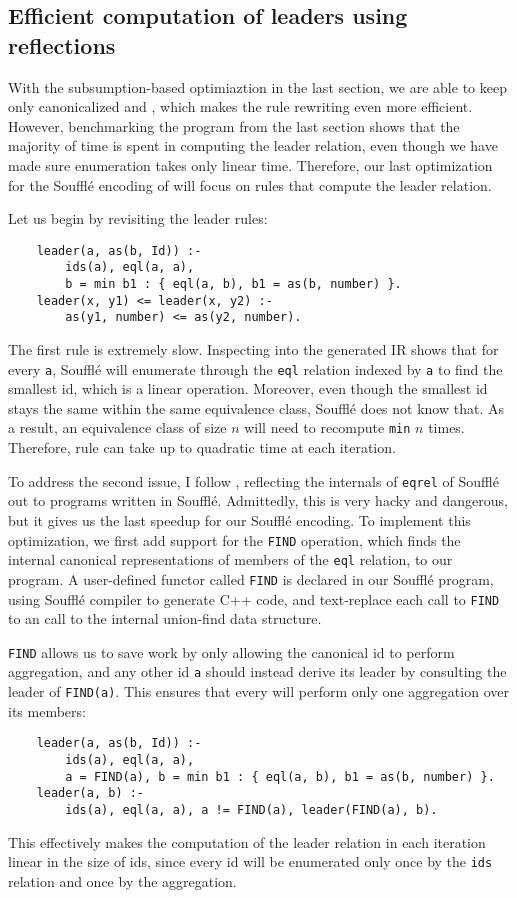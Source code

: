 \subsection{Efficient computation of leaders using reflections}\label{sec:hack}

With the subsumption-based optimiaztion in the last section,
 we are able to keep only canonicalized \enodes and \eclasses,
 which makes the rule rewriting even more efficient.
However, benchmarking the program from the last section
 shows that the majority of time is spent in computing the leader relation,
 even though we have made sure \eclass enumeration takes only linear time.
Therefore, our last optimization for the Souffl\'e encoding of \egraph
 will focus on rules that compute the leader relation.

Let us begin by revisiting the leader rules:
\begin{verbatim}
    leader(a, as(b, Id)) :- 
        ids(a), eql(a, a), 
        b = min b1 : { eql(a, b), b1 = as(b, number) }.
    leader(x, y1) <= leader(x, y2) :-
        as(y1, number) <= as(y2, number).
\end{verbatim}
The first rule is extremely slow.
Inspecting into the generated IR
 shows that for every \verb|a|, 
 Souffl\'e will enumerate through the \verb|eql| relation indexed by \verb|a|
 to find the smallest id,
 which is a linear operation.
Moreover,
 even though the smallest id stays the same within the same equivalence class,
 Souffl\'e does not know that.
As a result,
 an equivalence class of size $n$ will need to recompute \verb|min| $n$ times.
Therefore, rule can take up to quadratic time at each iteration.

To address the second issue, 
 I follow \citet{zucker-udf-1}, 
 reflecting the internals of \verb|eqrel| of Souffl\'e out
 to programs written in Souffl\'e.
Admittedly, this is very hacky and dangerous,
 but it gives us the last speedup for our Souffl\'e encoding.
To implement this optimization, 
 we first add support for the \verb|FIND| operation, 
 which finds the internal canonical representations
 of members of the \verb|eql| relation, to our program.
A user-defined functor called \verb|FIND| is declared
 in our Souffl\'e program,
 using Souffl\'e compiler to generate C++ code, 
 and text-replace each call to \verb|FIND| to an call 
 to the internal union-find data structure.

\verb|FIND| allows us to save work by
 only allowing the canonical id to perform aggregation,
 and any other id \verb|a| should instead derive its leader by consulting the leader
 of \verb|FIND(a)|.
This ensures that every \eclass will perform only one aggregation over its members:
\begin{verbatim}
    leader(a, as(b, Id)) :- 
        ids(a), eql(a, a), 
        a = FIND(a), b = min b1 : { eql(a, b), b1 = as(b, number) }.
    leader(a, b) :- 
        ids(a), eql(a, a), a != FIND(a), leader(FIND(a), b).
\end{verbatim}
This effectively makes the computation of the leader relation in each iteration
 linear in the size of ids,
 since every id will be enumerated only once by the \verb|ids| relation
 and once by the aggregation.

